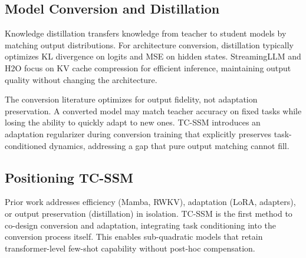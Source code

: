 \subsection{Model Conversion and Distillation}

Knowledge distillation \cite{Hinton2015Distilling} transfers knowledge from teacher to student models by matching output distributions. For architecture conversion, distillation typically optimizes KL divergence on logits and MSE on hidden states. StreamingLLM \cite{Xiao2023StreamingLLM} and H2O \cite{Zhang2023H2O} focus on KV cache compression for efficient inference, maintaining output quality without changing the architecture.

The conversion literature optimizes for output fidelity, not adaptation preservation. A converted model may match teacher accuracy on fixed tasks while losing the ability to quickly adapt to new ones. TC-SSM introduces an adaptation regularizer during conversion training that explicitly preserves task-conditioned dynamics, addressing a gap that pure output matching cannot fill.

\subsection{Positioning TC-SSM}

Prior work addresses efficiency (Mamba, RWKV), adaptation (LoRA, adapters), or output preservation (distillation) in isolation. TC-SSM is the first method to co-design conversion and adaptation, integrating task conditioning into the conversion process itself. This enables sub-quadratic models that retain transformer-level few-shot capability without post-hoc compensation.
